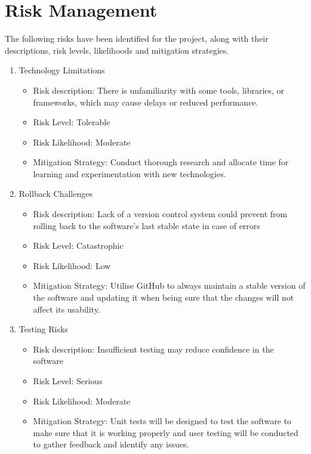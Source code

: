 \documentclass[12pt]{article}
\begin{document}
\section{Risk Management}
    The following risks have been identified for the project, along with their descriptions, risk levels, likelihoods and mitigation strategies.
        \begin{enumerate}
             
       
        \item{Technology Limitations}
        \begin{itemize}
            \item Risk description: There is unfamiliarity with some tools, libraries, or frameworks, which may cause delays or reduced performance. 
            \item Risk Level: Tolerable
            \item Risk Likelihood: Moderate
            \item Mitigation Strategy: Conduct thorough research and allocate time for learning and experimentation with new technologies.
        \end{itemize}

        \item{Rollback Challenges}
        \begin{itemize}
            \item Risk description: Lack of a version control system could prevent from rolling back to the software's last stable state in case of errors
            \item Risk Level: Catastrophic
            \item Risk Likelihood: Low
            \item Mitigation Strategy: Utilise GitHub to always maintain a stable version of the software and updating it when being sure that the changes will not affect its usability. 
        \end{itemize}

        \item{Testing Risks}
        \begin{itemize}
            \item Risk description: Insufficient testing may reduce confidence in the software
            \item Risk Level: Serious
            \item Risk Likelihood: Moderate
            \item Mitigation Strategy: Unit tests will be designed to test the software to make sure that it is working properly and user testing will be conducted to gather feedback and identify any issues.
        \end{itemize}


\end{enumerate}
\end{document}
